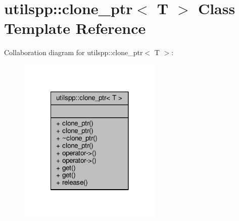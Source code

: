\hypertarget{classutilspp_1_1clone__ptr}{\section{utilspp\-:\-:clone\-\_\-ptr$<$ T $>$ Class Template Reference}
\label{classutilspp_1_1clone__ptr}
}


Collaboration diagram for utilspp\-:\-:clone\-\_\-ptr$<$ T $>$\-:\nopagebreak
\begin{figure}[H]
\begin{center}
\leavevmode
\includegraphics[width=194pt]{classutilspp_1_1clone__ptr__coll__graph}
\end{center}
\end{figure}
